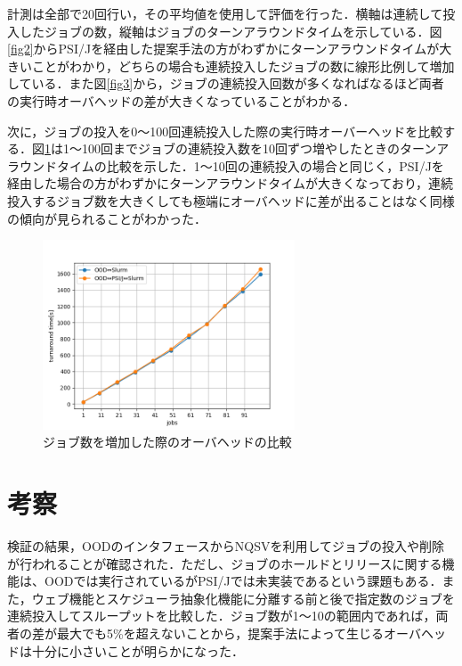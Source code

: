 \documentclass[a4paper,oneside,twocolumn,notitlepage,dvipdfmx]{jsarticle}
\begin{document}
計測は全部で20回行い，その平均値を使用して評価を行った．横軸は連続して投入したジョブの数，縦軸はジョブのターンアラウンドタイムを示している．図\ref{fig2}からPSI/Jを経由した提案手法の方がわずかにターンアラウンドタイムが大きいことがわかり，どちらの場合も連続投入したジョブの数に線形比例して増加している．また図\ref{fig3}から，ジョブの連続投入回数が多くなればなるほど両者の実行時オーバヘッドの差が大きくなっていることがわかる．\par
次に，ジョブの投入を0～100回連続投入した際の実行時オーバーヘッドを比較する．図\ref{fig5}は1～100回までジョブの連続投入数を10回ずつ増やしたときのターンアラウンドタイムの比較を示した．1～10回の連続投入の場合と同じく，PSI/Jを経由した場合の方がわずかにターンアラウンドタイムが大きくなっており，連続投入するジョブ数を大きくしても極端にオーバヘッドに差が出ることはなく同様の傾向が見られることがわかった．\par

\begin{figure}[h]
  \centering
  \includegraphics[width=75mm]{./fig/100jobs.png}
  \caption{ジョブ数を増加した際のオーバヘッドの比較}
  \label{fig5}
\end{figure}

\section{考察}
検証の結果，OODのインタフェースからNQSVを利用してジョブの投入や削除が行われることが確認された．ただし、ジョブのホールドとリリースに関する機能は、OODでは実行されているがPSI/Jでは未実装であるという課題もある．また，ウェブ機能とスケジューラ抽象化機能に分離する前と後で指定数のジョブを連続投入してスループットを比較した．ジョブ数が1～10の範囲内であれば，両者の差が最大でも5\%を超えないことから，提案手法によって生じるオーバヘッドは十分に小さいことが明らかになった．\par
\end{document}
